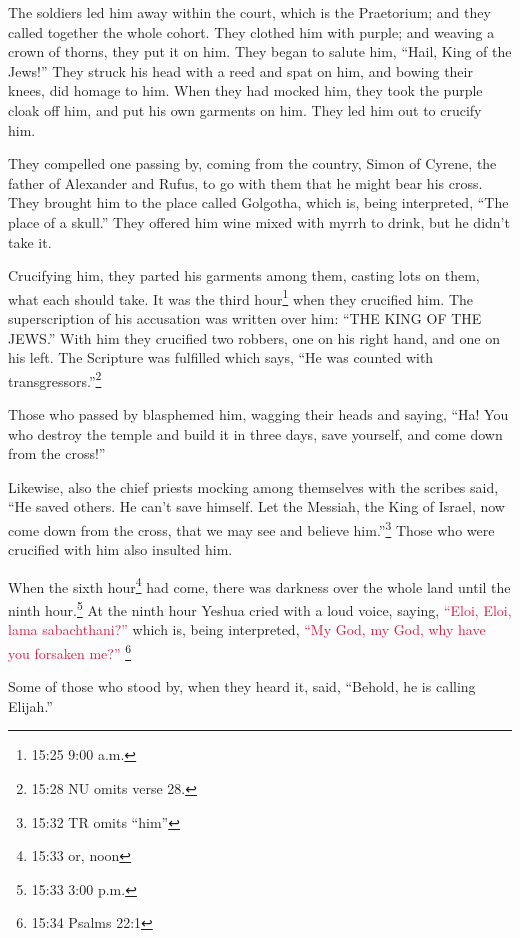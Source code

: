 \myverse{}The soldiers led him away within the court, which is the Praetorium;
and they called together the whole cohort.
\myverse{}They clothed him with purple; and weaving a crown of thorns, they put it
on him.
\myverse{}They began to salute him, “Hail, King of the Jews!”
\myverse{}They struck his head with a reed and spat on him, and bowing their knees,
did homage to him.
\myverse{}When they had mocked him, they took the purple cloak off him, and put his
own garments on him. They led him out to crucify him.

\myverse{}They compelled one passing by, coming from the country, Simon
of Cyrene, the father of Alexander and Rufus, to go with them that he might bear his cross.
\myverse{}They brought him to the place called Golgotha, which is, being interpreted,
“The place of a skull.”
\myverse{}They offered him wine mixed with myrrh to drink, but he didn’t take it.

\myverse{}Crucifying him, they parted his garments among them, casting
lots on them, what each should take.
\myverse{}It was the third hour\footnote{15:25 9:00 a.m.} when they crucified him.
\myverse{}The superscription of his accusation was written over him: “THE KING OF THE
JEWS.”
\myverse{}With him they crucified two robbers, one on his right hand, and one on his
left.
\myverse{}The Scripture was fulfilled which says, “He was counted with transgressors.”\footnote{15:28 NU omits verse 28.}

\myverse{}Those who passed by blasphemed him, wagging their heads and
saying, “Ha! You who destroy the temple and build it in three days,
\myverse{}save yourself, and come down from the cross!”

\myverse{}Likewise, also the chief priests mocking among themselves with
the scribes said, “He saved others. He can’t save himself.
\myverse{}Let the Messiah, the King of Israel, now come down from the cross, that we
may see and believe him.”\footnote{15:32 TR omits “him”} Those who were crucified with him also insulted him.

\myverse{}When the sixth hour\footnote{15:33 or, noon} had come, there was darkness over the whole land until the ninth hour.\footnote{15:33 3:00 p.m.}
\myverse{}At the ninth hour Yeshua cried with a loud voice, saying,
\textcolor{crimson}{“Eloi, Eloi, lama sabachthani?”} which is, being interpreted,
\textcolor{crimson}{“My God, my God, why have you forsaken me?”}
\footnote{15:34 Psalms 22:1}

\myverse{}Some of those who stood by, when they heard it, said, “Behold,
he is calling Elijah.”

